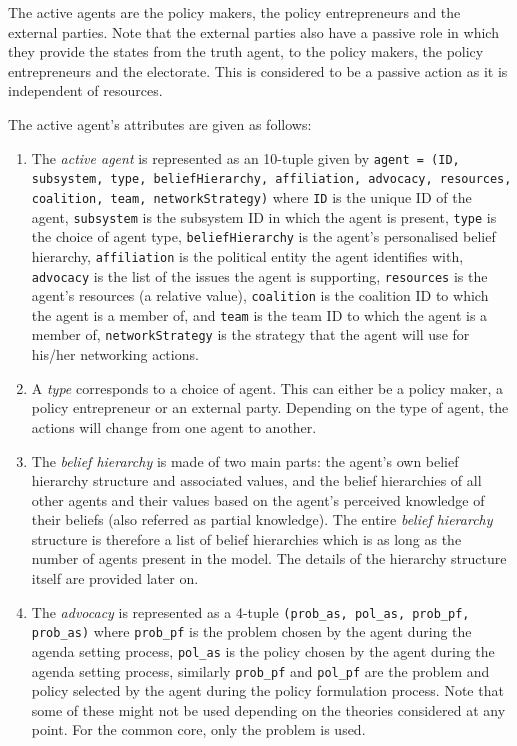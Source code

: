 The active agents are the policy makers, the policy entrepreneurs and the external parties. Note that the external parties also have a passive role in which they provide the states from the truth agent, to the policy makers, the policy entrepreneurs and the electorate. This is considered to be a passive action as it is independent of resources.

The active agent's attributes are given as follows:

\begin{enumerate}

\item The \emph{active agent} is represented as an 10-tuple given by \texttt{agent = (ID, subsystem, type, beliefHierarchy, affiliation, advocacy, resources, coalition, team, networkStrategy)} where
\texttt{ID} is the unique ID of the agent,
\texttt{subsystem} is the subsystem ID in which the agent is present,  
\texttt{type} is the choice of agent type, 
\texttt{beliefHierarchy} is the agent's personalised belief hierarchy, 
\texttt{affiliation} is the political entity the agent identifies with,  
\texttt{advocacy} is the list of the issues the agent is supporting, 
\texttt{resources} is the agent's resources (a relative value), 
\texttt{coalition} is the coalition ID to which the agent is a member of, and 
\texttt{team} is the team ID to which the agent is a member of,
\texttt{networkStrategy} is the strategy that the agent will use for his/her networking actions.

\item A \emph{type} corresponds to a choice of agent. This can either be a policy maker, a policy entrepreneur or an external party. Depending on the type of agent, the actions will change from one agent to another.

\item The \emph{belief hierarchy} is made of two main parts: the agent's own belief hierarchy structure and associated values, and the belief hierarchies of all other agents and their values based on the agent's perceived knowledge of their beliefs (also referred as partial knowledge). The entire \emph{belief hierarchy} structure is therefore a list of belief hierarchies which is as long as the number of agents present in the model. The details of the hierarchy structure itself are provided later on.

\item The \emph{advocacy} is represented as a 4-tuple \texttt{(prob\_as, pol\_as, prob\_pf, prob\_as)} where \texttt{prob\_pf} is the problem chosen by the agent during the agenda setting process, \texttt{pol\_as} is the policy chosen by the agent during the agenda setting process, similarly \texttt{prob\_pf} and \texttt{pol\_pf} are the problem and policy selected by the agent during the policy formulation process. Note that some of these might not be used depending on the theories considered at any point. For the common core, only the problem is used.


\end{enumerate}
